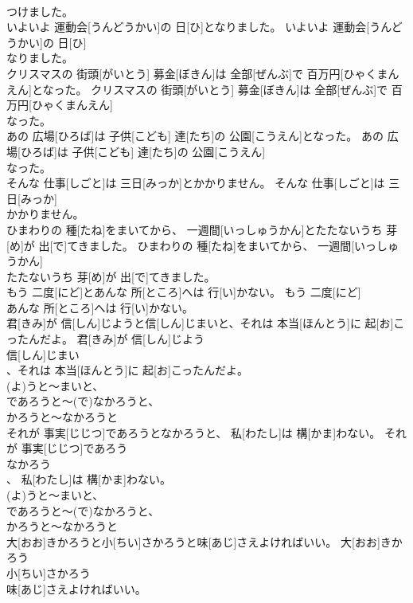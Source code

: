 \documentclass[8pt]{extreport}
\begin{document}
\begin{CJK}{UTF8}{min}
\\	つけました。	
\\	いよいよ 運動会[うんどうかい]の 日[ひ]となりました。	いよいよ 運動会[うんどうかい]の 日[ひ]
\\	なりました。	
\\	クリスマスの 街頭[がいとう] 募金[ぼきん]は 全部[ぜんぶ]で 百万円[ひゃくまんえん]となった。	クリスマスの 街頭[がいとう] 募金[ぼきん]は 全部[ぜんぶ]で 百万円[ひゃくまんえん]
\\	なった。	
\\	あの 広場[ひろば]は 子供[こども] 達[たち]の 公園[こうえん]となった。	あの 広場[ひろば]は 子供[こども] 達[たち]の 公園[こうえん]
\\	なった。	
\\	そんな 仕事[しごと]は 三日[みっか]とかかりません。	そんな 仕事[しごと]は 三日[みっか]
\\	かかりません。	
\\	ひまわりの 種[たね]をまいてから、 一週間[いっしゅうかん]とたたないうち 芽[め]が 出[で]てきました。	ひまわりの 種[たね]をまいてから、 一週間[いっしゅうかん]
\\	たたないうち 芽[め]が 出[で]てきました。	
\\	もう 二度[にど]とあんな 所[ところ]へは 行[い]かない。	もう 二度[にど]
\\	あんな 所[ところ]へは 行[い]かない。	
\\	君[きみ]が 信[しん]じようと信[しん]じまいと、それは 本当[ほんとう]に 起[お]こったんだよ。	君[きみ]が 信[しん]じよう
\\	信[しん]じまい
\\	、それは 本当[ほんとう]に 起[お]こったんだよ。	
\\	(よ)うと～まいと、
\\	であろうと～(で)なかろうと、
\\	かろうと～なかろうと
\\	それが 事実[じじつ]であろうとなかろうと、 私[わたし]は 構[かま]わない。	それが 事実[じじつ]であろう
\\	なかろう
\\	、 私[わたし]は 構[かま]わない。	
\\	(よ)うと～まいと、
\\	であろうと～(で)なかろうと、
\\	かろうと～なかろうと
\\	大[おお]きかろうと小[ちい]さかろうと味[あじ]さえよければいい。	大[おお]きかろう
\\	小[ちい]さかろう
\\	味[あじ]さえよければいい。	

\end{CJK}
\end{document}
